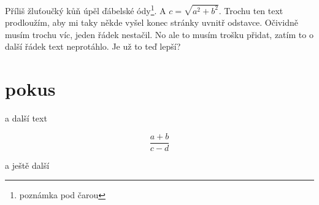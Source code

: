 \documentclass{article}
\begin{document}
 Příliš žluťoučký kůň úpěl ďábelské ódy\footnote{poznámka pod čarou}. A $c=\sqrt{a^2+b^2}$. Trochu ten text prodloužím, aby mi taky někde vyšel konec stránky uvnitř odstavce. Očividně musím trochu víc, jeden řádek nestačil. No ale to musím trošku přidat, zatím to o další řádek text neprotáhlo. Je už to teď lepší? 
 
 \section{pokus}
 
 a další text

\[\frac{a+b}{c-d}\]

a ještě další
\blinddocument
\end{document}

